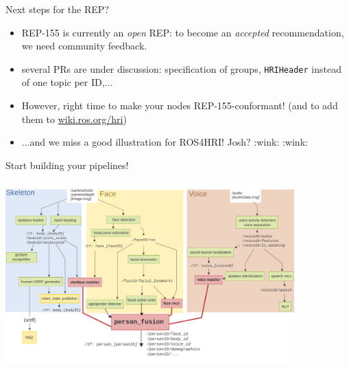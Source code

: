 \documentclass[xcolor=table,aspectratio=169]{beamer}
\begin{document}
\begin{frame}{Next steps for the REP?}
    \begin{itemize}
        \item<+-> REP-155 is currently an \emph{open} REP: to become an
            \emph{accepted} recommendation, we need community feedback.

        \item<+-> several PRs are under discussion: specification of
            groups, \texttt{HRIHeader} instead of one topic per ID,...
        \item<+-> However, right time to make your nodes REP-155-conformant!
            (and to add them to
            \href{https://wiki.ros.org/hri}{wiki.ros.org/hri})
        \item<+-> ...and we miss a good illustration for ROS4HRI! Josh? :wink: :wink:
    \end{itemize}
\end{frame}


\begin{frame}{Start building your pipelines!}

    \vspace{-2em}
    \begin{center}
        \includegraphics[height=7cm]{ros4hri/ros4hri-pipeline2}
    \end{center}
\end{frame}


\end{document}

